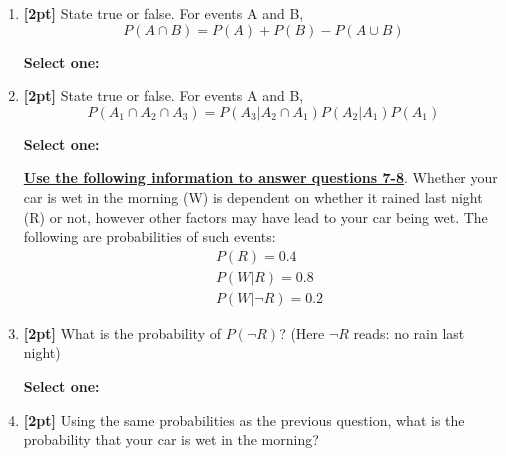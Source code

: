 \documentclass[12pt]{article}
\renewcommand{\circle}{\tikz\draw[black] (0,0) circle (1ex);}
\begin{document}
\begin{enumerate}
    \item \textbf{[2pt]} State true or false.  For events A and B, $$ P(A \cap B) = P(A) + P(B) - P(A \cup B)$$

    \textbf{Select one:}


    \item \textbf{[2pt]} State true or false. For events A and B, $$P(A_1\cap A_2 \cap A_3) = P(A_3|A_2\cap A_1)P(A_2|A_1)P(A_1)$$

    \textbf{Select one:}

    
    
    \bigskip\bigskip\bigskip
    \textbf{\underline{Use the following information to answer questions 7-8}}. Whether your car is wet in the morning (W) is dependent on whether it rained last night (R) or not, however other factors may have lead to your car being wet. The following are probabilities of such events:
    \begin{eqnarray*}
        & P(R) = 0.4\\
        & P(W | R) = 0.8\\
        & P(W | \neg R ) = 0.2
    \end{eqnarray*}
    

    \item \textbf{[2pt]} What is the probability of $P(\neg R)$?
(Here $ \neg R$ reads: no rain last night)

    \textbf{Select one:}


    \item \textbf{[2pt]} Using the same probabilities as the previous question, what is the probability that your car is wet in the morning?


\end{enumerate}
\end{document}
